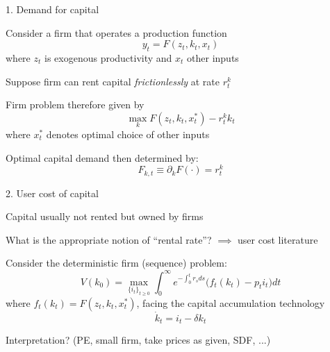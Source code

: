\documentclass[11pt, aspectratio=169]{beamer}
\newenvironment{witemize}{\itemize\addtolength{\itemsep}{10pt}}{\enditemize}
\begin{document}
\begin{frame}{1. Demand for capital}
\begin{witemize}
\item Consider a firm that operates a production function 
\begin{equation*}
	y_t = F(z_t, k_t, x_t)
\end{equation*}
where $z_t$ is exogenous productivity and $x_t$ other inputs

\item Suppose firm can rent capital \textit{frictionlessly} at rate $r_t^k$

\item Firm problem therefore given by
\begin{equation*}
	\max_k F(z_t, k_t, x_t^*) - r_t^k k_t
\end{equation*}
where $x_t^*$ denotes optimal choice of other inputs 

\item Optimal capital demand then determined by:
\begin{equation*}
	F_{k, t} \equiv \partial_k F(\cdot) = r_t^k
\end{equation*}

\end{witemize}
\end{frame}


\begin{frame}{2. User cost of capital}
\begin{witemize}
\item Capital usually not rented but owned by firms

\item What is the appropriate notion of ``rental rate''? $\implies$ user cost literature

\item Consider the deterministic firm (sequence) problem:
\begin{equation*}
	V(k_0) = \max_{ \{i_t\}_{t \geq 0} } \int_0^\infty e^{- \int_0^t r_s ds} \Big( f_t(k_t) - p_t i_t \Big) dt
\end{equation*}
where $f_t(k_t) = F(z_t, k_t, x_t^*)$, facing the capital accumulation technology 
\begin{equation*}
	\dot k_t = i_t - \delta k_t
\end{equation*}

\item Interpretation? (PE, small firm, take prices as given, SDF, ...)

\end{witemize}
\end{frame}
\end{document}
